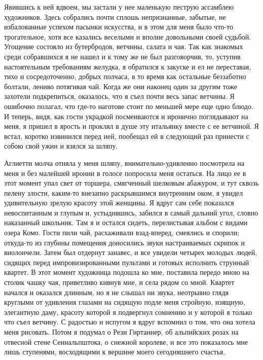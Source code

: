 Явившись к  ней вдвоем, мы  застали у нее маленькую  пеструю ассамблею
художников.  Здесь собрались  почти сплошь  непризнанные, забытые,  не
избалованные успехом пасынки искусства, и  в этом для меня было что-то
трогательное,  хотя все  казались веселыми  и вполне  довольными своей
судьбой.  Угощение состояло  из  бутербродов, ветчины,  салата и  чая.
Так  как  знакомых  среди собравшихся  я  не  нашел  и  к тому  же  не
был  разговорчив, то,  уступив  настоятельным  требованиям желудка,  я
обратился к закуске и ел  не переставая, тихо и сосредоточенно, добрых
полчаса, в то время как остальные беззаботно болтали, лениво потягивая
чай. Когда же  они наконец один за другим  тоже захотели подкрепиться,
оказалось, что  я съел почти  весь запас ветчины. Я  ошибочно полагал,
что где-то  наготове стоит по меньшей  мере еще одно блюдо.  И теперь,
видя, как гости украдкой посмеиваются  и иронично поглядывают на меня,
я пришел в ярость и проклял в душе эту итальянку вместе с ее ветчиной.
Я  встал, коротко  извинился перед  ней, пообещал  ей в  следующий раз
принести с собою свой ужин и взялся за шляпу.

Аглиетти молча  отняла у меня шляпу,  внимательно-удивленно посмотрела
на меня  и без малейшей  иронии в  голосе попросила меня  остаться. На
лицо  ее в  этот  момент  упал свет  от  торшера, смягченный  шелковым
абажуром, и  тут сквозь пелену злости,  каким-то внезапно раскрывшимся
внутренним оком, я увидел удивительную  зрелую красоту этой женщины. Я
вдруг  сам  себе  показался  невоспитанным и  глупым  и,  устыдившись,
забился  в самый  дальний угол,  словно наказанный  школьник. Там  я и
остался  сидеть,  перелистывая  альбом  с  видами  озера  Комо.  Гости
пили чай,  расхаживали взад-вперед,  смеялись и спорили;  откуда-то из
глубины помещения доносились звуки настраиваемых скрипок и виолончели.
Затем  был отдернут  занавес,  и все  увидели  четырех молодых  людей,
сидящих перед импровизированными пультами и готовых исполнить струнный
квартет. В этот момент художница подошла ко мне, поставила передо мною
на столик  чашку чая,  приветливо кивнув  мне, и  села рядом  со мной.
Квартет начался и оказался длинным, но я не слышал ни звука, неотрывно
глядя круглыми  от удивления глазами  на сидящую подле  меня стройную,
изящную, элегантную  даму, красоту которой  я подвергнул сомнению  и у
которой  я только  что  съел ветчину.  С радостью  и  испугом я  вдруг
вспомнил о том,  что она хотела меня рисовать. Потом  я подумал о Рези
Гиртаннер,  об альпийских  розах  на отвесной  стене Сеннальпштока,  о
снежной королеве, и все это показалось мне лишь ступенями, восходящими
к вершине моего сегодняшнего счастья.

